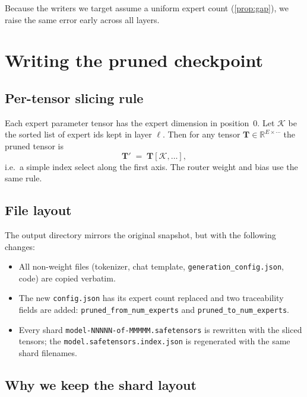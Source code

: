 \documentclass[11pt,a4paper]{article}
\newcommand{\R}{\mathbb{R}}
\newcommand{\1}{\mathbf{1}}
\newcommand{\Keep}{\mathcal{K}}
\theoremstyle{plain}
\begin{document}
Because the writers we target assume a uniform expert count
(\autoref{prop:gap}), we raise the same error early across all layers.

\section{Writing the pruned checkpoint}
\label{sec:writer}

\subsection{Per-tensor slicing rule}

Each expert parameter tensor has the expert dimension in position~0.
Let $\Keep$ be the sorted list of expert ids kept in layer $\ell$.
Then for any tensor $\bm{T} \in \R^{E \times \cdots}$ the pruned
tensor is
\begin{equation}
  \bm{T}' \;=\; \bm{T}[\Keep, \dots],
  \label{eq:slice}
\end{equation}
i.e.\ a simple index select along the first axis.  The router weight
and bias use the same rule.

\subsection{File layout}

The output directory mirrors the original snapshot, but with the
following changes:
\begin{itemize}
  \item All non-weight files (tokenizer, chat template,
        \texttt{generation\_config.json}, code) are copied verbatim.
  \item The new \texttt{config.json} has its expert count replaced
        and two traceability fields are added:
        \nolinkurl{pruned_from_num_experts} and
        \nolinkurl{pruned_to_num_experts}.
  \item Every shard \nolinkurl{model-NNNNN-of-MMMMM.safetensors} is
        rewritten with the sliced tensors; the
        \nolinkurl{model.safetensors.index.json} is regenerated with the
        same shard filenames.
\end{itemize}

\subsection{Why we keep the shard layout}
\end{document}
